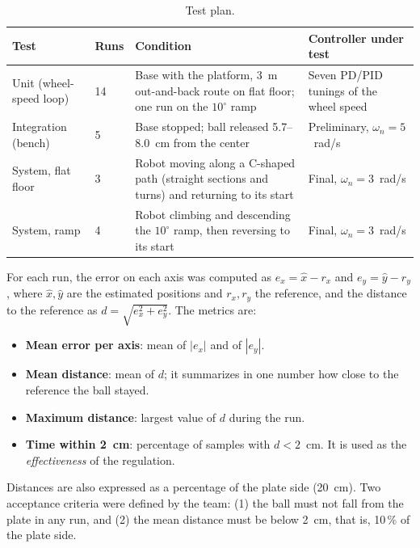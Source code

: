 \documentclass[11pt,letterpaper]{article}
\begin{document}
\begin{table}[H]
\centering
\caption{Test plan.}
\label{tab:plan}
\small
\begin{tabularx}{\textwidth}{@{}L{3.2cm}L{1.0cm}YL{3.0cm}@{}}
\toprule
\textbf{Test} & \textbf{Runs} & \textbf{Condition} & \textbf{Controller under test} \\
\midrule
Unit (wheel-speed loop) & 14 & Base with the platform, 3~m out-and-back route on flat floor; one run on the $10^\circ$ ramp & Seven PD/PID tunings of the wheel speed \\
Integration (bench) & 5 & Base stopped; ball released 5.7--8.0~cm from the center & Preliminary, $\omega_n=5$~rad/s \\
System, flat floor & 3 & Robot moving along a C-shaped path (straight sections and turns) and returning to its start & Final, $\omega_n=3$~rad/s \\
System, ramp & 4 & Robot climbing and descending the $10^\circ$ ramp, then reversing to its start & Final, $\omega_n=3$~rad/s \\
\bottomrule
\end{tabularx}
\end{table}

For each run, the error on each axis was computed as $e_x=\hat x-r_x$
and $e_y=\hat y-r_y$, where $\hat x,\hat y$ are the estimated positions
and $r_x, r_y$ the reference, and the distance to the reference as
$d=\sqrt{e_x^2+e_y^2}$. The metrics are:
\begin{itemize}
    \item \textbf{Mean error per axis}: mean of $|e_x|$ and of $|e_y|$.
    \item \textbf{Mean distance}: mean of $d$; it summarizes in one number
    how close to the reference the ball stayed.
    \item \textbf{Maximum distance}: largest value of $d$ during the run.
    \item \textbf{Time within 2~cm}: percentage of samples with
    $d<2$~cm. It is used as the \textit{effectiveness} of the regulation.
\end{itemize}
Distances are also expressed as a percentage of the plate side (20~cm).
Two acceptance criteria were defined by the team: (1) the ball must not
fall from the plate in any run, and (2) the mean distance must be below
2~cm, that is, 10\,\% of the plate side.
\end{document}
